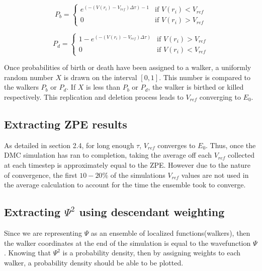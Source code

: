 \documentclass{article}
\begin{document}

\begin{equation}
P_b = \begin{cases}
e^{(-(V(r_{i})-V_{ref})\Delta\tau)-1} &\text{if $V(r_{i})<V_{ref}$}\\
0 &\text{if $V(r_{i})>V_{ref}$}
\end{cases}
\end{equation}

\begin{equation}
P_d = \begin{cases}
1-e^{(-(V(r_{i})-V_{ref})\Delta\tau)} &\text{if $V(r_{i})>V_{ref}$}\\
0 &\text{if $V(r_{i})<V_{ref}$}
\end{cases}
\end{equation}




Once probabilities of birth or death have been assigned to a walker, a uniformly random number $X$ is drawn on the interval $[0, 1]$. This number is compared to the walkers $P_{b}$ or $P_{d}$. If $X$ is less than $P_{b}$ or $P_{d}$, the walker is birthed or killed respectively. This replication and deletion process leads to $V_{ref}$ converging to $E_{0}$. 

\subsection{Extracting ZPE results}
As detailed in section 2.4, for long enough $\tau$, $V_{ref}$ converges to $E_{0}$. Thus, once the DMC simulation has ran to completion, taking the average off each $V_{ref}$ collected at each timestep is approximately equal to the ZPE. However due to the nature of convergence, the first $10-20\%$ of the simulations $V_{ref}$ values are not used in the average calculation to account for the time the ensemble took to converge. 


\subsection{Extracting $\Psi^2$ using descendant weighting}
Since we are representing $\Psi$ as an ensemble of localized functions(walkers), then the walker coordinates at the end of the simulation is equal to the wavefunction $\Psi$. Knowing that $\Psi^2$ is a probability density, then by assigning weights to each walker, a probability density should be able to be plotted. 
\end{document}
